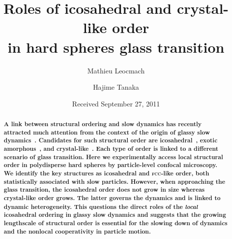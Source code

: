 

\usepackage{xr}



\title{Roles of icosahedral and crystal-like order \\ in hard spheres glass transition} 


\author{Mathieu Leocmach} 

\author{Hajime Tanaka}

\date{Received September 27, 2011}

\begin{abstract}
\textbf{
A link between structural ordering and slow dynamics has recently attracted much attention from the context of the origin of glassy slow dynamics~\citep{cavagna2009supercooled,BerthierR}. Candidates for such structural order are icosahedral~\cite{steinhardt1983boo,sadoc1999geometrical, tarjus2005fba}, exotic amorphous~\cite{lubchenko2007}, and crystal-like~\cite{tanaka2010critical}. Each type of order is linked to a different scenario of glass transition. Here we experimentally access local structural order in polydisperse hard spheres by particle-level confocal microscopy. We identify the key structures as icosahedral and \textmd{\textsc{fcc}}-like order, both statistically associated with slow particles. However, when approaching the glass transition, the icosahedral order does not grow in size whereas crystal-like order grows. The latter governs the dynamics and is linked to dynamic heterogeneity. This questions the direct roles of the \emph{local} icosahedral ordering in glassy slow dynamics and suggests that the growing lengthscale of structural order is essential for the slowing down of dynamics and the nonlocal cooperativity in particle motion. 
}
\end{abstract}
\maketitle


